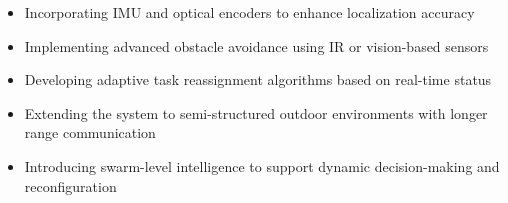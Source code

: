 \documentclass[conference]{IEEEtran}
\begin{document}
\begin{itemize}
\item Incorporating IMU and optical encoders to enhance localization accuracy
\item Implementing advanced obstacle avoidance using IR or vision-based sensors
\item Developing adaptive task reassignment algorithms based on real-time status
\item Extending the system to semi-structured outdoor environments with longer range communication
\item Introducing swarm-level intelligence to support dynamic decision-making and reconfiguration
\end{itemize}



\end{document}
